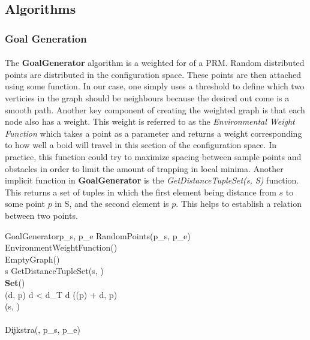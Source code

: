 \documentclass[12pt]{article}
\begin{document}
\subsection{Algorithms}
\subsubsection{Goal Generation}
\paragraph{} The \textbf{GoalGenerator} algorithm is a weighted for of a PRM. Random distributed points are distributed in the configuration space. These points are then attached using some function. In our case, one simply uses a threshold to define which two verticies in the graph should be neighbours because the desired out come is a smooth path. Another key component of creating the weighted graph is that each node also has a weight. This weight is referred to as the \textit{Environmental Weight Function} which takes a point as a parameter and returns a weight corresponding to how well a boid will travel in this section of the configuration space. In practice, this function could try to maximize spacing between sample points and obstacles in order to limit the amount of trapping in local minima. Another implicit function in \textbf{GoalGenerator} is the \textit{GetDistanceTupleSet(s, S)} function. This returns a set of tuples in which the first element being distance from \(s\) to some point \(p\) in S, and the second element is \(p\). This helps to establish a relation between two points.

\begin{pseudocode} {GoalGenerator}{p_s, p_e}
 \GETS RandomPoints(p_s, p_e) \\
\omega \GETS EnvironmentWeightFunction() \\
 \GETS EmptyGraph() \\
\FOREACH s \in {}
\DO 
\BEGIN
{} \GETS GetDistanceTupleSet(s, ) \\
 \GETS \textbf{Set}() \\
\FOREACH (d, p) \in {}
\DO
\BEGIN
\IF d < d_T \wedge d 
\THEN {}(\omega(p) + d, p)
\END \\
(s, ) \\
\END \\
 \GETS Dijkstra(, p_s, p_e) \\ 
\end{pseudocode}
\end{document}
